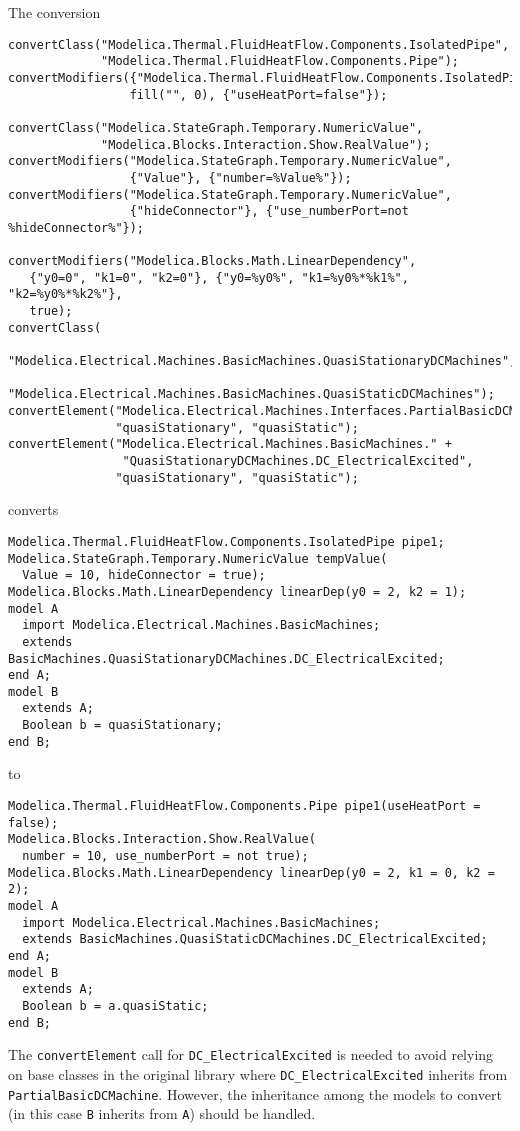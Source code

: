 \begin{example}
The conversion
\begin{lstlisting}[language=modelica]
convertClass("Modelica.Thermal.FluidHeatFlow.Components.IsolatedPipe",
             "Modelica.Thermal.FluidHeatFlow.Components.Pipe");
convertModifiers({"Modelica.Thermal.FluidHeatFlow.Components.IsolatedPipe"},
                 fill("", 0), {"useHeatPort=false"});

convertClass("Modelica.StateGraph.Temporary.NumericValue",
             "Modelica.Blocks.Interaction.Show.RealValue");
convertModifiers("Modelica.StateGraph.Temporary.NumericValue",
                 {"Value"}, {"number=%Value%"});
convertModifiers("Modelica.StateGraph.Temporary.NumericValue",
                 {"hideConnector"}, {"use_numberPort=not %hideConnector%"});

convertModifiers("Modelica.Blocks.Math.LinearDependency",
   {"y0=0", "k1=0", "k2=0"}, {"y0=%y0%", "k1=%y0%*%k1%", "k2=%y0%*%k2%"},
   true);
convertClass(
   "Modelica.Electrical.Machines.BasicMachines.QuasiStationaryDCMachines",
   "Modelica.Electrical.Machines.BasicMachines.QuasiStaticDCMachines");
convertElement("Modelica.Electrical.Machines.Interfaces.PartialBasicDCMachine",
               "quasiStationary", "quasiStatic");
convertElement("Modelica.Electrical.Machines.BasicMachines." +
                "QuasiStationaryDCMachines.DC_ElectricalExcited",
               "quasiStationary", "quasiStatic");
\end{lstlisting}
converts
\begin{lstlisting}[language=modelica]
Modelica.Thermal.FluidHeatFlow.Components.IsolatedPipe pipe1;
Modelica.StateGraph.Temporary.NumericValue tempValue(
  Value = 10, hideConnector = true);
Modelica.Blocks.Math.LinearDependency linearDep(y0 = 2, k2 = 1);
model A
  import Modelica.Electrical.Machines.BasicMachines;
  extends BasicMachines.QuasiStationaryDCMachines.DC_ElectricalExcited;
end A;
model B
  extends A;
  Boolean b = quasiStationary;
end B;
\end{lstlisting}
to
\begin{lstlisting}[language=modelica]
Modelica.Thermal.FluidHeatFlow.Components.Pipe pipe1(useHeatPort = false);
Modelica.Blocks.Interaction.Show.RealValue(
  number = 10, use_numberPort = not true);
Modelica.Blocks.Math.LinearDependency linearDep(y0 = 2, k1 = 0, k2 = 2);
model A
  import Modelica.Electrical.Machines.BasicMachines;
  extends BasicMachines.QuasiStaticDCMachines.DC_ElectricalExcited;
end A;
model B
  extends A;
  Boolean b = a.quasiStatic;
end B;
\end{lstlisting}
The \lstinline!convertElement! call for \lstinline!DC_ElectricalExcited! is needed to avoid relying on base classes in the original library where \lstinline!DC_ElectricalExcited! inherits from \lstinline!PartialBasicDCMachine!.
However, the inheritance among the models to convert (in this case \lstinline!B! inherits from \lstinline!A!) should be handled.
\end{example}

